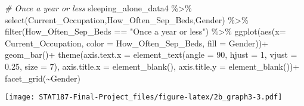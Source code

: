 \documentclass[
]{article}
\newenvironment{Shaded}{\begin{snugshade}}{\end{snugshade}}
\newcommand{\AttributeTok}[1]{\textcolor[rgb]{0.77,0.63,0.00}{#1}}
\newcommand{\CommentTok}[1]{\textcolor[rgb]{0.56,0.35,0.01}{\textit{#1}}}
\newcommand{\DecValTok}[1]{\textcolor[rgb]{0.00,0.00,0.81}{#1}}
\newcommand{\FloatTok}[1]{\textcolor[rgb]{0.00,0.00,0.81}{#1}}
\newcommand{\FunctionTok}[1]{\textcolor[rgb]{0.00,0.00,0.00}{#1}}
\newcommand{\NormalTok}[1]{#1}
\newcommand{\SpecialCharTok}[1]{\textcolor[rgb]{0.00,0.00,0.00}{#1}}
\newcommand{\StringTok}[1]{\textcolor[rgb]{0.31,0.60,0.02}{#1}}
\begin{document}
\begin{Shaded}
\begin{Highlighting}[]
\CommentTok{\# Once a year or less }
\NormalTok{sleeping\_alone\_data4 }\SpecialCharTok{\%\textgreater{}\%}
  \FunctionTok{select}\NormalTok{(Current\_Occupation,How\_Often\_Sep\_Beds,Gender) }\SpecialCharTok{\%\textgreater{}\%}
  \FunctionTok{filter}\NormalTok{(How\_Often\_Sep\_Beds }\SpecialCharTok{==} \StringTok{"Once a year or less"}\NormalTok{) }\SpecialCharTok{\%\textgreater{}\%}
  \FunctionTok{ggplot}\NormalTok{(}\FunctionTok{aes}\NormalTok{(}\AttributeTok{x=}\NormalTok{ Current\_Occupation,}
             \AttributeTok{color =}\NormalTok{ How\_Often\_Sep\_Beds,}
             \AttributeTok{fill =}\NormalTok{ Gender))}\SpecialCharTok{+}
  \FunctionTok{geom\_bar}\NormalTok{()}\SpecialCharTok{+}
  \FunctionTok{theme}\NormalTok{(}\AttributeTok{axis.text.x =} \FunctionTok{element\_text}\NormalTok{(}\AttributeTok{angle =} \DecValTok{90}\NormalTok{,}
                                   \AttributeTok{hjust =} \DecValTok{1}\NormalTok{,}
                                   \AttributeTok{vjust =} \FloatTok{0.25}\NormalTok{,}
                                   \AttributeTok{size =} \DecValTok{7}\NormalTok{),}
        \AttributeTok{axis.title.x =} \FunctionTok{element\_blank}\NormalTok{(),}
        \AttributeTok{axis.title.y =} \FunctionTok{element\_blank}\NormalTok{())}\SpecialCharTok{+}
  \FunctionTok{facet\_grid}\NormalTok{(}\SpecialCharTok{\textasciitilde{}}\NormalTok{Gender)}
\end{Highlighting}
\end{Shaded}

\texttt{[image: STAT187-Final-Project\_files/figure-latex/2b\_graph3-3.pdf]}
\end{document}
